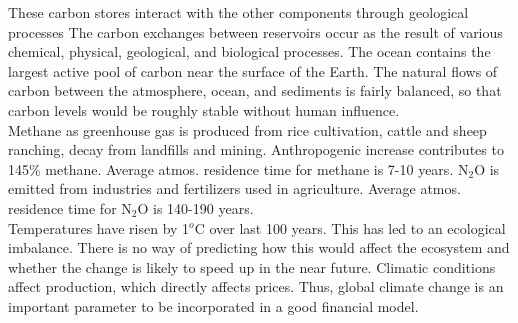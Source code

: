 \documentclass[pdftex,11pt,a4paper]{article}
\begin{document}
These carbon stores interact with the other 
components through geological processes
The carbon exchanges between reservoirs occur as the result of various chemical, physical, geological, 
and biological processes. The ocean contains the largest active pool of carbon near the surface of the Earth. 
The natural flows of carbon between the atmosphere, ocean, and sediments is fairly balanced, so that carbon levels 
would be roughly stable without human influence.\\

Methane as greenhouse gas is produced from rice cultivation, cattle and sheep ranching, decay from landfills and mining. Anthropogenic increase contributes to 145\% methane. Average atmos. residence time for methane is 7-10 years. N$_2$O is emitted from industries and fertilizers used in agriculture. Average atmos. residence time for N$_2$O is 140-190 years.\\

Temperatures have risen by 1$^o$C over last 100 years. This has led to an ecological imbalance. There is no way of predicting how this would affect the ecosystem and whether the change is likely to speed up in the near future. Climatic conditions affect production, which directly affects prices. Thus, global climate change is an important parameter to be incorporated in a good financial model.
\end{document}

